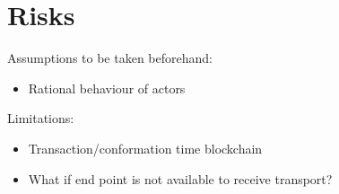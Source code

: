 \documentclass[11pt]{article}
\begin{document}
\section{Risks}

Assumptions to be taken beforehand:

\begin{itemize}
  \item Rational behaviour of actors
\end{itemize}

Limitations:

\begin{itemize}
  \item Transaction/conformation time blockchain
  \item What if end point is not available to receive transport?
\end{itemize}

\end{document}
